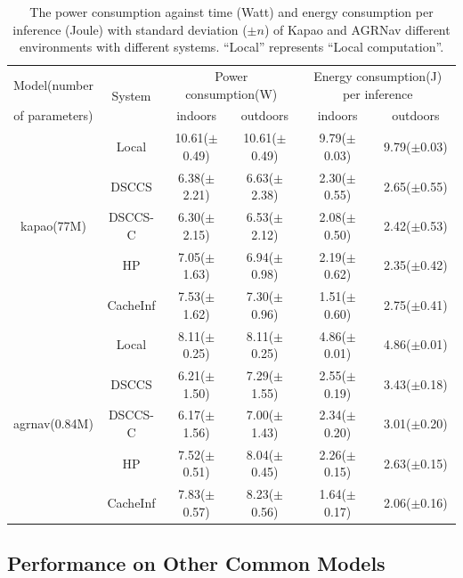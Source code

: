 \begin{table}[htb]
\centering
\begin{tabular}{cc|c|c|c|c}
\toprule
 Model(number & \multirow[c]{2}{*}{System} & \multicolumn{2}{|c|}{Power consumption(W)} & \multicolumn{2}{|c}{Energy consumption(J) per inference} \\
 of parameters)&  & indoors & outdoors & indoors & outdoors \\
\midrule
\midrule
\multirow[c]{5}{*}{kapao(77M)} & Local & 10.61($\pm$0.49) & 10.61($\pm$0.49) & 9.79($\pm$0.03) & 9.79($\pm$0.03) \\
 & DSCCS & 6.38($\pm$2.21) & 6.63($\pm$2.38) & 2.30($\pm$0.55) & 2.65($\pm$0.55) \\
 & DSCCS-C & 6.30($\pm$2.15) & 6.53($\pm$2.12) & 2.08($\pm$0.50) & 2.42($\pm$0.53) \\
 & HP & 7.05($\pm$1.63) & 6.94($\pm$0.98) & 2.19($\pm$0.62) & 2.35($\pm$0.42) \\
 & CacheInf & 7.53($\pm$1.62) & 7.30($\pm$0.96) & 1.51($\pm$0.60) & 2.75($\pm$0.41) \\
\cline{1-6}
\multirow[c]{5}{*}{agrnav(0.84M)} & Local & 8.11($\pm$0.25) & 8.11($\pm$0.25) & 4.86($\pm$0.01) & 4.86($\pm$0.01) \\
 & DSCCS & 6.21($\pm$1.50) & 7.29($\pm$1.55) & 2.55($\pm$0.19) & 3.43($\pm$0.18) \\
 & DSCCS-C & 6.17($\pm$1.56) & 7.00($\pm$1.43) & 2.34($\pm$0.20) & 3.01($\pm$0.20) \\
 & HP & 7.52($\pm$0.51) & 8.04($\pm$0.45) & 2.26($\pm$0.15) & 2.63($\pm$0.15) \\
 & CacheInf & 7.83($\pm$0.57) & 8.23($\pm$0.56) & 1.64($\pm$0.17) & 2.06($\pm$0.16) \\
\cline{1-6}
\bottomrule
\end{tabular}

    \caption{The power consumption against time (Watt) and energy consumption per inference (Joule) with standard deviation ($\pm n$) of Kapao and AGRNav different environments with different systems. ``Local'' represents ``Local computation''.}
    \label{tab:e2e_power}
\end{table}

\subsection{Performance on Other Common Models}

